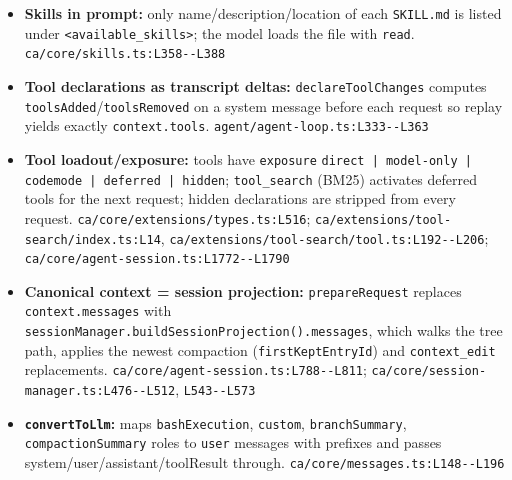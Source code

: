 \begin{itemize}
\item \textbf{Skills in prompt:} only name/description/location of each \texttt{SKILL.\allowbreak{}md} is listed under \texttt{<available\_\allowbreak{}skills>}; the model loads the file with \texttt{read}. \texttt{ca/\allowbreak{}core/\allowbreak{}skills.\allowbreak{}ts:\allowbreak{}L358-\allowbreak{}-\allowbreak{}L388}
\item \textbf{Tool declarations as transcript deltas:} \texttt{declareToolChanges} computes \texttt{toolsAdded}/\texttt{toolsRemoved} on a system message before each request so replay yields exactly \texttt{context.\allowbreak{}tools}. \texttt{agent/\allowbreak{}agent-\allowbreak{}loop.\allowbreak{}ts:\allowbreak{}L333-\allowbreak{}-\allowbreak{}L363}
\item \textbf{Tool loadout/exposure:} tools have \texttt{exposure} \texttt{direct | model-\allowbreak{}only | codemode | deferred | hidden}; \texttt{tool\_\allowbreak{}search} (BM25) activates deferred tools for the next request; hidden declarations are stripped from every request. \texttt{ca/\allowbreak{}core/\allowbreak{}extensions/\allowbreak{}types.\allowbreak{}ts:\allowbreak{}L516}; \texttt{ca/\allowbreak{}extensions/\allowbreak{}tool-\allowbreak{}search/\allowbreak{}index.\allowbreak{}ts:\allowbreak{}L14}, \texttt{ca/\allowbreak{}extensions/\allowbreak{}tool-\allowbreak{}search/\allowbreak{}tool.\allowbreak{}ts:\allowbreak{}L192-\allowbreak{}-\allowbreak{}L206}; \texttt{ca/\allowbreak{}core/\allowbreak{}agent-\allowbreak{}session.\allowbreak{}ts:\allowbreak{}L1772-\allowbreak{}-\allowbreak{}L1790}
\item \textbf{Canonical context = session projection:} \texttt{prepareRequest} replaces \texttt{context.\allowbreak{}messages} with \texttt{sessionManager.\allowbreak{}buildSessionProjection(\allowbreak{}).\allowbreak{}messages}, which walks the tree path, applies the newest compaction (\texttt{firstKeptEntryId}) and \texttt{context\_\allowbreak{}edit} replacements. \texttt{ca/\allowbreak{}core/\allowbreak{}agent-\allowbreak{}session.\allowbreak{}ts:\allowbreak{}L788-\allowbreak{}-\allowbreak{}L811}; \texttt{ca/\allowbreak{}core/\allowbreak{}session-\allowbreak{}manager.\allowbreak{}ts:\allowbreak{}L476-\allowbreak{}-\allowbreak{}L512}, \texttt{L543-\allowbreak{}-\allowbreak{}L573}
\item \textbf{\texttt{convertToLlm}:} maps \texttt{bashExecution}, \texttt{custom}, \texttt{branchSummary}, \texttt{compactionSummary} roles to \texttt{user} messages with prefixes and passes system/user/assistant/toolResult through. \texttt{ca/\allowbreak{}core/\allowbreak{}messages.\allowbreak{}ts:\allowbreak{}L148-\allowbreak{}-\allowbreak{}L196}

\end{itemize}
